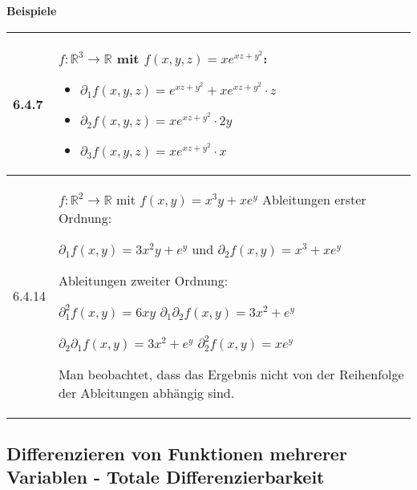     \noindent
    \textbf{Beispiele}
    \begin{table}[H]
    \begin{tabularx}{\textwidth}{X m{16cm}}
        \toprule

        6.4.7 & $f: \mathbb{R}^3 \rightarrow \mathbb{R}$ mit $f(x,y,z) = xe^{xz+y^2}$: 
                \begin{itemize}[topsep=-0.5cm]
                    \item[] $\partial_1 f(x,y,z) = e^{xz+y^2} + xe^{xz+y^2} \cdot z$ 
                    \item[] $\partial_2 f(x,y,z) = xe^{xz+y^2} \cdot 2y$
                    \item[] $\partial_3 f(x,y,z) = xe^{xz+y^2} \cdot x$
                \end{itemize} \vspace{-0cm}\\
        \midrule
        6.4.14& $f: \mathbb{R}^2 \rightarrow \mathbb{R}$ mit $f(x,y) = x^3 y + x e^y$ \hfill \break
                Ableitungen erster Ordnung: \hfill \break
                \centerline{$ \partial_1f(x,y) = 3x^2y + e^y$ und $\partial_2f(x,y) = x^3 + xe^y$}
                Ableitungen zweiter Ordnung: \hfill \break
                \centerline{$\partial_1^2 f(x,y) =6xy$ \hspace{1cm} $\partial_1 \partial_2f(x,y) = 3x^2 + e^y $}
                \centerline{$ \partial_2 \partial_1 f(x,y) = 3x^2 + e^y$ \hspace{1cm} $\partial_2^2f(x,y) = xe^y$} 
                Man beobachtet, dass das Ergebnis nicht von der Reihenfolge der Ableitungen abhängig sind. \\

        \bottomrule
    \end{tabularx}
    \end{table}

    \pagebreak

\subsection{Differenzieren von Funktionen mehrerer Variablen - Totale Differenzierbarkeit}

